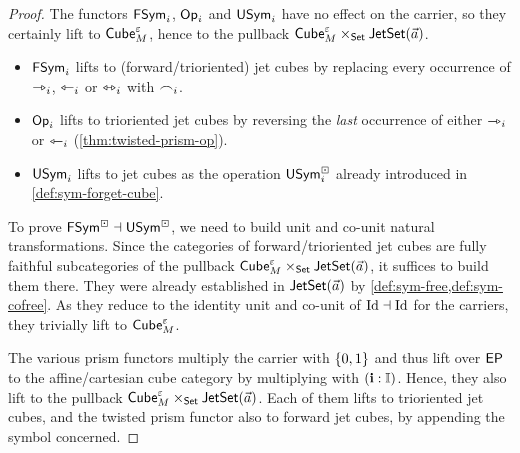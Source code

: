 \documentclass[a4paper]{article}
\begin{document}
\begin{proof}
	The functors $\mathsf{FSym}_i$, ${\mathsf{Op}}_i$ and $\mathsf{USym}_i$ have no effect on the carrier, so they certainly lift to ${\mathsf{Cube}}_M^\varepsilon$, hence to the pullback ${\mathsf{Cube}}_M^\varepsilon \times_{\mathsf{Set}} \mathsf{JetSet}(\vec a)$.
	\begin{itemize}
		\item $\mathsf{FSym}_i$ lifts to (forward/trioriented) jet cubes by replacing every occurrence of $\rightarrowtriangle_i$, $\leftarrowtriangle_i$ or $\leftrightarrowtriangle_i$ with $\frown_i$.
		\item ${\mathsf{Op}}_i$ lifts to trioriented jet cubes by reversing the \emph{last} occurrence of either $\rightarrowtriangle_i$ or $\leftarrowtriangle_i$ (\cref{thm:twisted-prism-op}).
		\item $\mathsf{USym}_i$ lifts to jet cubes as the operation $\mathsf{USym}^\boxdot_i$ already introduced in \cref{def:sym-forget-cube}.
	\end{itemize}
	To prove $\mathsf{FSym}^\boxdot \dashv \mathsf{USym}^\boxdot$, we need to build unit and co-unit natural transformations.
	Since the categories of forward/trioriented jet cubes are fully faithful subcategories of the pullback ${\mathsf{Cube}}_M^\varepsilon \times_{\mathsf{Set}} \mathsf{JetSet}(\vec a)$, it suffices to build them there.
	They were already established in $\mathsf{JetSet}(\vec a)$ by \cref{def:sym-free,def:sym-cofree}.
	As they reduce to the identity unit and co-unit of $\mathrm{Id} \dashv \mathrm{Id}$ for the carriers, they trivially lift to ${\mathsf{Cube}}_M^\varepsilon$.
	
	The various prism functors multiply the carrier with $\mathopen{}\left\{ 0, 1 \right\}\mathclose{}$ and thus lift over $\mathsf{EP}$ to the affine/cartesian cube category by multiplying with $(\mathbf{i} : {\mathbb I})$.
	Hence, they also lift to the pullback ${\mathsf{Cube}}_M^\varepsilon \times_{\mathsf{Set}} \mathsf{JetSet}(\vec a)$.
	Each of them lifts to trioriented jet cubes, and the twisted prism functor also to forward jet cubes, by appending the symbol concerned.
\end{proof}
\end{document}
